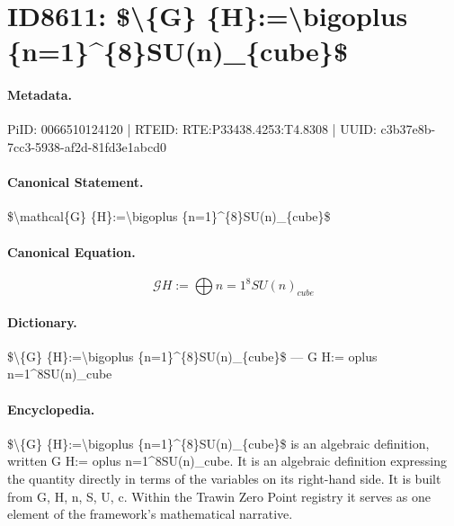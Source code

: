 \section*{ID8611: \$\textbackslash{}\{G\} \{H\}:=\textbackslash{}bigoplus \{n=1\}\textasciicircum{}\{8\}SU(n)\_\{cube\}\$}
\paragraph{Metadata.}
PiID: 0066510124120 | RTEID: RTE:P33438.4253:T4.8308 | UUID: c3b37e8b-7cc3-5938-af2d-81fd3e1abcd0

\paragraph{Canonical Statement.}
\$\textbackslash{}mathcal\{G\} \{H\}:=\textbackslash{}bigoplus \{n=1\}\textasciicircum{}\{8\}SU(n)\_\{cube\}\$

\paragraph{Canonical Equation.}
\[
\mathcal{G} {H}:=\bigoplus {n=1}^{8}SU(n)_{cube}
\]

\paragraph{Dictionary.}
\$\textbackslash{}\{G\} \{H\}:=\textbackslash{}bigoplus \{n=1\}\textasciicircum{}\{8\}SU(n)\_\{cube\}\$ — G H:= oplus n=1\textasciicircum{}8SU(n)\_cube

\paragraph{Encyclopedia.}
\$\textbackslash{}\{G\} \{H\}:=\textbackslash{}bigoplus \{n=1\}\textasciicircum{}\{8\}SU(n)\_\{cube\}\$ is an algebraic definition, written G H:= oplus n=1\textasciicircum{}8SU(n)\_cube. It is an algebraic definition expressing the quantity directly in terms of the variables on its right-hand side. It is built from G, H, n, S, U, c. Within the Trawin Zero Point registry it serves as one element of the framework's mathematical narrative.
